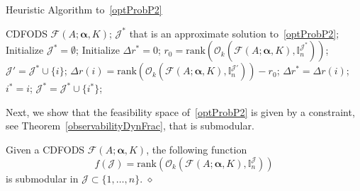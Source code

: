 \begin{algorithm}[tb]
   \caption{Heuristic Algorithm to~\eqref{optProbP2}}
   \label{algorithm1}
\begin{algorithmic}
    CDFODS $\mathcal F(A;\mathbf{\alpha},K)$;
       $\mathcal J^*$  that is an approximate solution to~\eqref{optProbP2};
      \vspace{0.2cm}
      {
   \STATE Initialize $ \mathcal J^*=\emptyset $; 
   \REPEAT
   \STATE Initialize $\Delta r^* = 0$;
   \STATE $r_{0}=\text{rank}(\mathcal O_k(\mathcal F(A;\mathbf{\alpha},K),\mathbb{I}_n^{\mathcal J^*}))$;
   \STATE $\mathcal J'= \mathcal J^* \cup \{i\}$;
   \STATE $\Delta r(i)=\text{rank}(\mathcal O_k(\mathcal F(A;\mathbf{\alpha},K),\mathbb{I}_n^{\mathcal J'}))-r_{0}$;
   \STATE $\Delta r^*=\Delta r(i)$;
   \STATE $i^*=i$;
   \ENDIF
   \ENDFOR
   \STATE $\mathcal J^*=\mathcal J^* \cup \{i^*\}$;
   \ENDIF
   }
\end{algorithmic}
\end{algorithm}

Next, we show that the feasibility space of~\eqref{optProbP2} is given by a constraint, see Theorem~\ref{observabilityDynFrac}, that is submodular.


\begin{lemma}
Given a CDFODS $\mathcal F(A;\mathbf{\alpha},K)$,  the following function $$f(\mathcal J)=\text{rank}(\mathcal O_k(\mathcal F(A;\mathbf{\alpha},K),\mathbb{I}_n^{\mathcal J}))$$ is submodular in $\mathcal J\subset\{1,\ldots, n\}$.
\hfill $\diamond$
\label{submodular}
\end{lemma}

